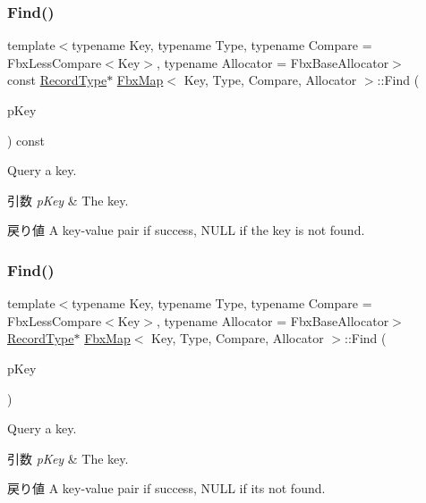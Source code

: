 \subsubsection{\texorpdfstring{Find()}{Find()}\hspace{0.1cm}{\footnotesize\ttfamily [1/2]}}
{\footnotesize\ttfamily template$<$typename Key, typename Type, typename Compare = Fbx\+Less\+Compare$<$\+Key$>$, typename Allocator = Fbx\+Base\+Allocator$>$ \\
const \hyperlink{class_fbx_map_af8fc887461b3bf29f41aa36d15ddb54f}{Record\+Type}$\ast$ \hyperlink{class_fbx_map}{Fbx\+Map}$<$ Key, Type, Compare, Allocator $>$\+::Find (\begin{DoxyParamCaption}\item[{const \hyperlink{class_fbx_map_ad8392c83b6f8eeb9e0706bcc8674270a}{Key\+Type} \&}]{p\+Key }\end{DoxyParamCaption}) const}

Query a key. 
\begin{DoxyParams}{引数}
{\em p\+Key} & The key. \\
\hline
\end{DoxyParams}
\begin{DoxyReturn}{戻り値}
A key-\/value pair if success, N\+U\+LL if the key is not found. 
\end{DoxyReturn}
\mbox{\label{class_fbx_map_a3ed10339972bfa73f5123a871c1f7e5d}} 
\subsubsection{\texorpdfstring{Find()}{Find()}\hspace{0.1cm}{\footnotesize\ttfamily [2/2]}}
{\footnotesize\ttfamily template$<$typename Key, typename Type, typename Compare = Fbx\+Less\+Compare$<$\+Key$>$, typename Allocator = Fbx\+Base\+Allocator$>$ \\
\hyperlink{class_fbx_map_af8fc887461b3bf29f41aa36d15ddb54f}{Record\+Type}$\ast$ \hyperlink{class_fbx_map}{Fbx\+Map}$<$ Key, Type, Compare, Allocator $>$\+::Find (\begin{DoxyParamCaption}\item[{const \hyperlink{class_fbx_map_ad8392c83b6f8eeb9e0706bcc8674270a}{Key\+Type} \&}]{p\+Key }\end{DoxyParamCaption})}

Query a key. 
\begin{DoxyParams}{引数}
{\em p\+Key} & The key. \\
\hline
\end{DoxyParams}
\begin{DoxyReturn}{戻り値}
A key-\/value pair if success, N\+U\+LL if it\textquotesingle{}s not found. 
\end{DoxyReturn}
\mbox{\label{class_fbx_map_a0dcb49b244b4de4a27b4157a5915d2ae}} 
